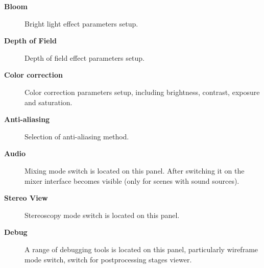 \documentclass[a4paper,12pt,oneside]{sphinxmanual}
\begin{document}
\begin{description}
\item[{\textbf{Bloom}}] \leavevmode
Bright light effect parameters setup.

\item[{\textbf{Depth of Field}}] \leavevmode
Depth of field effect parameters setup.

\item[{\textbf{Color correction}}] \leavevmode
Color correction parameters setup, including brightness, contrast, exposure and saturation.

\item[{\textbf{Anti-aliasing}}] \leavevmode
Selection of anti-aliasing method.

\item[{\textbf{Audio}}] \leavevmode
Mixing mode switch is located on this panel. After switching it on the mixer interface becomes visible (only for scenes with sound sources).

\item[{\textbf{Stereo View}}] \leavevmode
Stereoscopy mode switch is located on this panel.

\item[{\textbf{Debug}}] \leavevmode
A range of debugging tools is located on this panel, particularly wireframe mode switch, switch for postprocessing stages viewer.

\end{description}
\end{document}
